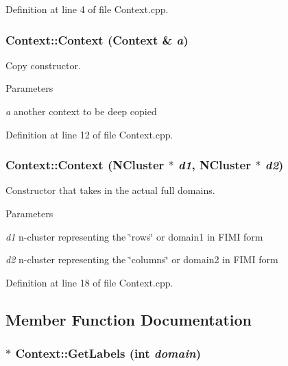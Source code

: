Definition at line 4 of file Context.cpp.

\hypertarget{class_context_ac0423f54b36186488e04d7723c52fee4}{
\subsubsection[{Context}]{\setlength{\rightskip}{0pt plus 5cm}Context::Context ({\bf Context} \& {\em a})}}
\label{class_context_ac0423f54b36186488e04d7723c52fee4}


Copy constructor. 


\begin{DoxyParams}{Parameters}
\item[{\em a}]another context to be deep copied \end{DoxyParams}


Definition at line 12 of file Context.cpp.

\hypertarget{class_context_ae66f36043dcffe09e73765eed28eb782}{
\subsubsection[{Context}]{\setlength{\rightskip}{0pt plus 5cm}Context::Context ({\bf NCluster} $\ast$ {\em d1}, \/  {\bf NCluster} $\ast$ {\em d2})}}
\label{class_context_ae66f36043dcffe09e73765eed28eb782}


Constructor that takes in the actual full domains. 


\begin{DoxyParams}{Parameters}
\item[{\em d1}]n-\/cluster representing the \char`\"{}rows\char`\"{} or domain1 in FIMI form \item[{\em d2}]n-\/cluster representing the \char`\"{}columns\char`\"{} or domain2 in FIMI form \end{DoxyParams}


Definition at line 18 of file Context.cpp.



\subsection{Member Function Documentation}
\hypertarget{class_context_a980ed3eb69cc388465263025203cf1c8}{
\subsubsection[{GetLabels}]{ $\ast$ Context::GetLabels (int {\em domain})}}
\label{class_context_a980ed3eb69cc388465263025203cf1c8}


